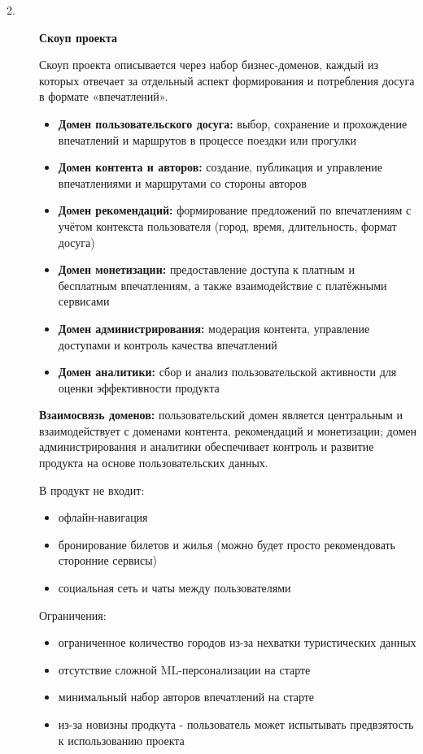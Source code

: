 \documentclass[a4paper]{article}
\begin{document}
\begin{description}
    \item[\Large2.] \Large \textbf{Скоуп проекта}

    \normalsize Скоуп проекта описывается через набор бизнес-доменов, каждый из которых отвечает за отдельный аспект формирования и потребления досуга в формате «впечатлений».

    \begin{itemize}[label=$-$]
        \item \textbf{Домен пользовательского досуга:} выбор, сохранение и прохождение впечатлений и маршрутов в процессе поездки или прогулки
        \item \textbf{Домен контента и авторов:} создание, публикация и управление впечатлениями и маршрутами со стороны авторов
        \item \textbf{Домен рекомендаций:} формирование предложений по впечатлениям с учётом контекста пользователя (город, время, длительность, формат досуга)
        \item \textbf{Домен монетизации:} предоставление доступа к платным и бесплатным впечатлениям, а также взаимодействие с платёжными сервисами
        \item \textbf{Домен администрирования:} модерация контента, управление доступами и контроль качества впечатлений
        \item \textbf{Домен аналитики:} сбор и анализ пользовательской активности для оценки эффективности продукта
    \end{itemize}

\textbf{Взаимосвязь доменов:} пользовательский домен является центральным и взаимодействует с доменами контента, рекомендаций и монетизации; домен администрирования и аналитики обеспечивает контроль и развитие продукта на основе пользовательских данных.


    В продукт не входит:

    \begin{itemize}[label=$-$]
        \item офлайн-навигация
        \item бронирование билетов и жилья (можно будет просто рекомендовать сторонние сервисы)
        \item социальная сеть и чаты между пользователями
    \end{itemize}

    Ограничения:

    \begin{itemize}[label=$-$]
        \item ограниченное количество городов из-за нехватки туристических данных
        \item отсутствие сложной ML-персонализации на старте
        \item минимальный набор авторов впечатлений на старте
        \item из-за новизны продкута - пользователь может испытывать предвзятость к использованию проекта
    \end{itemize}


\end{description}
\end{document}
